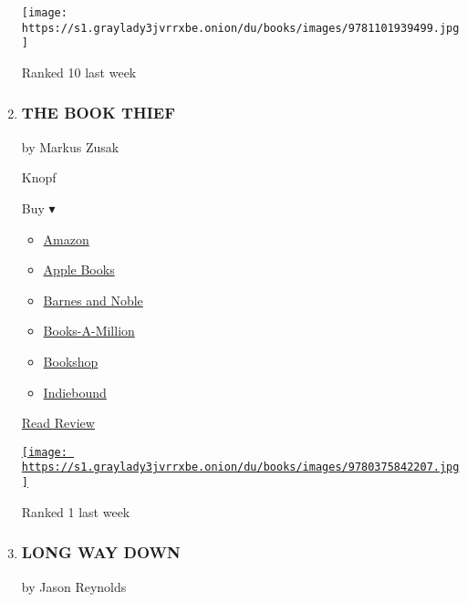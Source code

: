 \begin{enumerate}
  \texttt{[image: https://s1.graylady3jvrrxbe.onion/du/books/images/9781101939499.jpg]}

  Ranked 10 last week
\item
  \href{https://www.nytimes3xbfgragh.onion/2006/03/27/books/27masl.html}{}

  \hypertarget{the-book-thief}{%
  \subsubsection{THE BOOK THIEF}\label{the-book-thief}}

  by Markus Zusak

  Knopf

  Buy ▾

  \begin{itemize}
  \tightlist
  \item
    \href{http://www.amazon.com/The-Book-Thief-Markus-Zusak/dp/0375842209?tag=NYTBS-20}{Amazon}
  \item
    \href{https://du-gae-books-dot-nyt-du-prd.appspot.com/buy?title=THE+BOOK+THIEF\&author=Markus+Zusak}{Apple
    Books}
  \item
    \href{https://www.anrdoezrs.net/click-7990613-11819508?url=https\%3A\%2F\%2Fwww.barnesandnoble.com\%2Fw\%2F\%3Fean\%3D9780375842207}{Barnes
    and Noble}
  \item
    \href{https://www.anrdoezrs.net/click-7990613-35140?url=https\%3A\%2F\%2Fwww.booksamillion.com\%2Fp\%2FTHE\%2BBOOK\%2BTHIEF\%2FMarkus\%2BZusak\%2F9780375842207}{Books-A-Million}
  \item
    \href{https://bookshop.org/a/3546/9780375842207}{Bookshop}
  \item
    \href{https://www.indiebound.org/book/9780375842207?aff=NYT}{Indiebound}
  \end{itemize}

  \href{https://www.nytimes3xbfgragh.onion/2006/03/27/books/27masl.html}{Read
  Review}

  \href{https://www.nytimes3xbfgragh.onion/2006/03/27/books/27masl.html}{\texttt{[image: https://s1.graylady3jvrrxbe.onion/du/books/images/9780375842207.jpg]}}

  Ranked 1 last week
\item
  \hypertarget{long-way-down}{%
  \subsubsection{LONG WAY DOWN}\label{long-way-down}}

  by Jason Reynolds


\end{enumerate}
